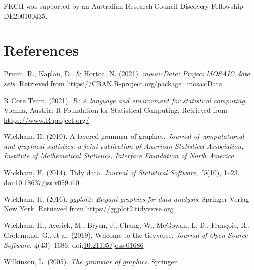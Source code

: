 \documentclass[10pt,a4paper,onecolumn]{article}
\newlength{\cslhangindent}
\newlength{\cslentryspacingunit} %
\newenvironment{CSLReferences}[2] %
 {%
  \setlength{\parindent}{0pt}
  \ifodd #1
  \let\oldpar\par
  \def\par{\hangindent=\cslhangindent\oldpar}
  \fi
  \setlength{\parskip}{#2\cslentryspacingunit}
 }%
 {}
\begin{document}
FKCH was supported by an Australian Research Council Discovery
Fellowship DE200100435.

\hypertarget{references}{%
\section*{References}\label{references}}

\hypertarget{refs}{}
\begin{CSLReferences}{1}{0}
\leavevmode{}%
Pruim, R., Kaplan, D., \& Horton, N. (2021). \emph{mosaicData: Project
MOSAIC data sets}. Retrieved from
\url{https://CRAN.R-project.org/package=mosaicData}

\leavevmode{}%
R Core Team. (2021). \emph{R: A language and environment for statistical
computing}. Vienna, Austria: R Foundation for Statistical Computing.
Retrieved from \url{https://www.R-project.org/}

\leavevmode{}%
Wickham, H. (2010). A layered grammar of graphics. \emph{Journal of
computational and graphical statistics: a joint publication of American
Statistical Association, Institute of Mathematical Statistics, Interface
Foundation of North America}.

\leavevmode{}%
Wickham, H. (2014). Tidy data. \emph{Journal of Statistical Software},
\emph{59}(10), 1--23.
doi:\href{https://doi.org/10.18637/jss.v059.i10}{10.18637/jss.v059.i10}

\leavevmode{}%
Wickham, H. (2016). \emph{ggplot2: Elegant graphics for data analysis}.
Springer-Verlag New York. Retrieved from
\url{https://ggplot2.tidyverse.org}

\leavevmode{}%
Wickham, H., Averick, M., Bryan, J., Chang, W., McGowan, L. D.,
François, R., Grolemund, G., et al. (2019). Welcome to the {tidyverse}.
\emph{Journal of Open Source Software}, \emph{4}(43), 1686.
doi:\href{https://doi.org/10.21105/joss.01686}{10.21105/joss.01686}

\leavevmode{}%
Wilkinson, L. (2005). \emph{The grammar of graphics}. Springer.

\end{CSLReferences}
\end{document}
